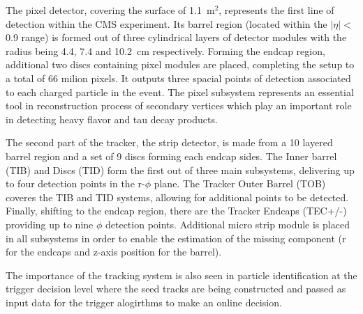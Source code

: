 \hspace{10pt} The pixel detector, covering the surface of 1.1~m$^{\text{2}}$, represents the first line of detection within the CMS experiment. Its barrel region (located within the $|\eta|<$0.9 range) is formed out of three cylindrical layers of detector modules with the radius being 4.4, 7.4 and 10.2~cm respectively. Forming the endcap region, additional two discs containing pixel modules are placed, completing the setup to a total of 66 milion pixels. It outputs three spacial points of detection associated to each charged particle in the event. The pixel subsystem represents an essential tool in reconstruction process of secondary vertices which play an important role in detecting heavy flavor and tau decay products. 

\hspace{10pt} The second part of the tracker, the strip detector, is made from a 10 layered barrel region and a set of 9 discs forming each endcap sides. The Inner barrel (TIB) and Discs (TID) form the first out of three main subsystems, delivering up to four detection points in the r-$\phi$ plane. The Tracker Outer Barrel (TOB) coveres the TIB and TID systems, allowing for additional points to be detected. Finally, shifting to the endcap region, there are the Tracker Endcaps (TEC+/-) providing up to nine $\phi$ detection points. Additional micro strip module is placed in all subsystems in order to enable the estimation of the missing component (r for the endcaps and z-axis position for the barrel).

\hspace{10pt} The importance of the tracking system is also seen in particle identification at the trigger decision level where the seed tracks are being constructed and passed as input data for the  trigger alogirthms to make an online decision.



